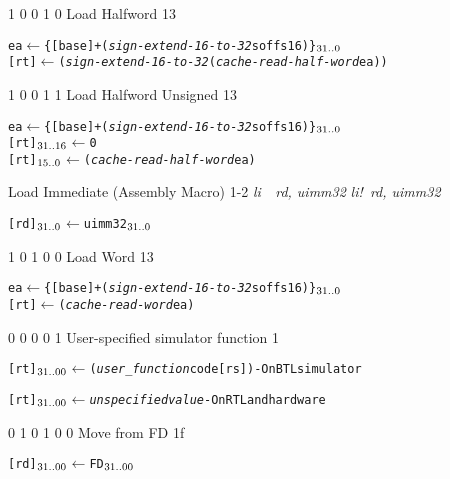      {1 0 0 1 0}    {Load Halfword}           {1}{3} {\RawTag}
\begin{alltt}
        ea    \(\leftarrow\) \{ [base] + ({\em{sign-extend-16-to-32}} soffs16) \}\(\sb{31..0}\)
        [rt]  \(\leftarrow\) ({\em{sign-extend-16-to-32}} ({\em{cache-read-half-word}} ea))
\end{alltt}\rawInstrEnd

    {1 0 0 1 1}    {Load Halfword Unsigned}  {1}{3} {\RawTag}
\begin{alltt}
        ea        \(\leftarrow\) \{ [base] + ({\em{sign-extend-16-to-32}} soffs16) \}\(\sb{31..0}\)
        [rt]\(\sb{31..16}\)  \(\leftarrow\) 0
        [rt]\(\sb{15..0}\)   \(\leftarrow\) ({\em{cache-read-half-word}} ea)
\end{alltt}\rawInstrEnd

       {Load Immediate (Assembly Macro)} {1-2} {\MIPSTag} {{\em li~~rd, uimm32}} {{\em li!~rd, uimm32}}
\begin{alltt}
        [rd]\(\sb{31..0}\)  \(\leftarrow\) uimm32\(\sb{31..0}\)
\end{alltt}\rawInstrEnd


     {1 0 1 0 0}    {Load Word}               {1}{3} {\RawTag}
\begin{alltt}
        ea    \(\leftarrow\) \{ [base] + ({\em{sign-extend-16-to-32}} soffs16) \}\(\sb{31..0}\)
        [rt]  \(\leftarrow\) ({\em{cache-read-word}} ea)
\end{alltt}\rawInstrEnd

     {0 0 0 0 1} {User-specified simulator function}  {1}   {\RawTag}
\begin{alltt}
        [rt]\({\sb{31..00}}\) \(\leftarrow\)  ({\em{user_function}} code [rs]) - {\textsf{On BTL simulator}}

        [rt]\({\sb{31..00}}\) \(\leftarrow\)  {\em{unspecified value}}         - {\textsf{On RTL and hardware}}

\end{alltt}\rawInstrEnd

      {0 1 0 1 0 0} {Move from FD}   {1f}   {\RawTag}
\begin{alltt}
        [rd]\({\sb{31..00}}\) \(\leftarrow\)  FD\({\sb{31..00}}\)
\end{alltt}\rawInstrEnd

